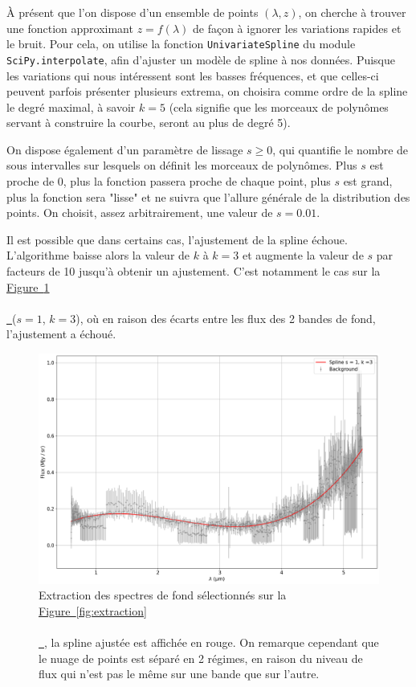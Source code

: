 \documentclass[12pt, a4paper]{article}
\newcommand*{\figref}[2][]{%
  \hyperref[{#2}]{%
    Figure~\ref*{#2}%
    \ifx\\#1\\%
    \else
      \,#1%
    \fi
  }%
}
\begin{document}
À présent que l'on dispose d'un ensemble de points $(\lambda, z)$, on cherche à trouver une fonction approximant $z = f(\lambda)$ de façon à ignorer les variations rapides et le bruit. Pour cela, on utilise la fonction \texttt{UnivariateSpline} du module \texttt{SciPy.interpolate}, afin d'ajuster un modèle de spline à nos données. Puisque les variations qui nous intéressent sont les basses fréquences, et que celles-ci peuvent parfois présenter plusieurs extrema, on choisira comme ordre de la spline le degré maximal, à savoir $k=5$ (cela signifie que les morceaux de polynômes servant à construire la courbe, seront au plus de degré 5). 

On dispose également d'un paramètre de lissage $s \geq 0$, qui quantifie le nombre de sous intervalles sur lesquels on définit les morceaux de polynômes. Plus $s$ est proche de 0, plus la fonction passera proche de chaque point, plus $s$ est grand, plus la fonction sera "lisse" et ne suivra que l'allure générale de la distribution des points. On choisit, assez arbitrairement, une valeur de $s=0.01$.

Il est possible que dans certains cas, l'ajustement de la spline échoue. L'algorithme baisse alors la valeur de $k$ à $k=3$ et augmente la valeur de $s$ par facteurs de 10 jusqu'à obtenir un ajustement. C'est notamment le cas sur la \figref{fig:spline_fit} ($s=1$, $k=3$), où en raison des écarts entre les flux des 2 bandes de fond, l'ajustement a échoué.

\begin{figure}[H]
  \centering
  \includegraphics[scale=0.45]{assets/fit_spline.png}
  \caption{Extraction des spectres de fond sélectionnés sur la \figref{fig:extraction}, la spline ajustée est affichée en rouge. On remarque cependant que le nuage de points est séparé en 2 régimes, en raison du niveau de flux qui n'est pas le même sur une bande que sur l'autre.}
  \label{fig:spline_fit}
\end{figure}
\end{document}
